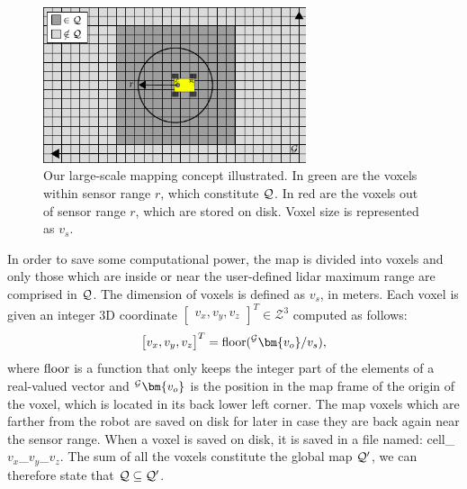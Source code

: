 \begin{figure}
	\centering
	\includegraphics[height=1.8in]{figs/tiled_mapping/tiled_mapping.pdf}
	\caption{Our large-scale mapping concept illustrated.
		In green are the voxels within sensor range $r$, which constitute $\mathcal{Q}$.
		In red are the voxels out of sensor range $r$, which are stored on disk.
		Voxel size is represented as $v_s$.}
	\label{fig:tiled_map}
\end{figure}

In order to save some computational power, the map is divided into voxels and only those which are inside or near the user-defined lidar maximum range are comprised in $\mathcal{Q}$.
The dimension of voxels is defined as $v_s$, in meters. %
Each voxel is given an integer 3D coordinate $\begin{bmatrix} v_{x}, v_{y}, v_{z} \end{bmatrix}^T \in \mathcal{Z}^3$ computed as follows:
\begin{equation*}
	\begin{bmatrix} v_{x}, v_{y}, v_{z} \end{bmatrix}^T = \floor(^{\mapf}\bm{v_o} / v_s),
\end{equation*}
where $\operatorname*{floor}$ is a function that only keeps the integer part of the elements of a real-valued vector and $^{\mapf}\bm{v_o}$ is the position in the map frame of the origin of the voxel, which is located in its back lower left corner.
The map voxels which are farther from the robot are saved on disk for later in case they are back again near the sensor range.
When a voxel is saved on disk, it is saved in a file named: cell\_$v_x$\_$v_y$\_$v_z$.
The sum of all the voxels constitute the global map $\mathcal{Q}'$, we can therefore state that $\mathcal{Q} \subseteq \mathcal{Q}'$. %

